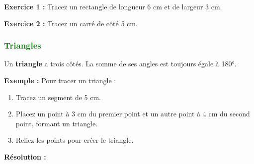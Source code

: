 \documentclass{article}
\begin{document}
\vspace{0.2cm}

\begin{tcolorbox}[colback=yellow!10!white, colframe=yellow!75!black, title=\textcolor{white}{Exercices}, sharp corners=south]
    \textbf{Exercice 1 :} Tracez un rectangle de longueur 6 cm et de largeur 3 cm.

    \textbf{Exercice 2 :} Tracez un carré de côté 5 cm.
\end{tcolorbox}

\subsubsection{\textcolor{green}{Triangles}}

\begin{tcolorbox}[colback=red!10!white, colframe=red!75!black, title=\textcolor{white}{Définitions}, sharp corners=south]
    Un \textbf{triangle} a trois côtés. La somme de ses angles est toujours égale à 180°.
\end{tcolorbox}

\vspace{0.2cm}

\begin{tcolorbox}[colback=orange!10!white, colframe=orange!75!black, title=\textcolor{white}{Exemple de traçage}, sharp corners=south]
    \textbf{Exemple :} Pour tracer un triangle :
    \begin{enumerate}
        \item Tracez un segment de 5 cm.
        \item Placez un point à 3 cm du premier point et un autre point à 4 cm du second point, formant un triangle.
        \item Reliez les points pour créer le triangle.
    \end{enumerate}
\end{tcolorbox}

\vspace{0.2cm}

\textbf{Résolution :}
\end{document}
